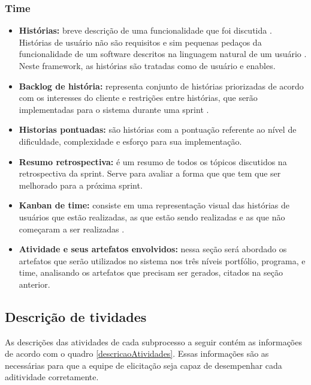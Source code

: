 \subsubsection{Time}
\begin{itemize}
    \item \textbf{Histórias:} breve descrição de uma funcionalidade que foi discutida \cite{leffingwell2011}. Histórias de usuário não são requisitos e sim pequenas pedaços da funcionalidade de um software descritos na linguagem natural de um usuário \cite{safe}. Neste framework, as histórias são tratadas como de usuário e enables.
    \item \textbf{Backlog de história:} representa conjunto de histórias priorizadas de acordo com os interesses do cliente e restrições entre histórias, que serão implementadas para o sistema durante uma sprint \cite{safe}.
    \item \textbf{Historias pontuadas:} são histórias com a pontuação referente ao nível de dificuldade, complexidade e esforço para sua implementação.
    \item \textbf{Resumo retrospectiva:} é um resumo de todos os tópicos discutidos na retrospectiva da sprint. Serve para avaliar a forma que que tem que ser melhorado para a próxima sprint.
    \item \textbf{Kanban de time:} consiste em uma representação visual das histórias de usuários que estão realizadas, as que estão sendo realizadas e as que não começaram a ser realizadas \cite{leffingwell2011}.
    \item \textbf{Atividade e seus artefatos envolvidos:} nessa seção será abordado os artefatos que serão utilizados no sistema nos três níveis portfólio, programa, e time, analisando os artefatos que precisam ser gerados, citados na seção anterior.
\end{itemize}

\subsection{Descrição de tividades}

As descrições das atividades de cada subprocesso a seguir contém as informações de acordo com o quadro \ref{descricaoAtividades}. Essas informações são as necessárias para que a equipe de elicitação seja capaz de desempenhar cada aditividade corretamente.

